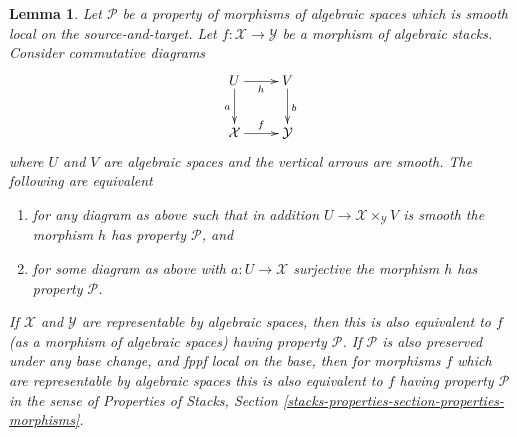 \documentclass[10pt,a4paper]{amsart}
\theoremstyle{plain}
\newtheorem{lemma}[subsection]{Lemma}
\theoremstyle{definition}
\theoremstyle{remark}
\numberwithin{equation}{subsection}
\begin{document}
\begin{lemma}
\label{lemma-local-source-target}
Let $\mathcal{P}$ be a property of morphisms of algebraic spaces
which is smooth local on the source-and-target.
Let $f : \mathcal{X} \to \mathcal{Y}$ be a morphism of algebraic stacks.
Consider commutative diagrams
$$
\xymatrix{
U \ar[d]_a \ar[r]_h & V \ar[d]^b \\
\mathcal{X} \ar[r]^f & \mathcal{Y}
}
$$
where $U$ and $V$ are algebraic spaces and the vertical arrows are smooth.
The following are equivalent
\begin{enumerate}
\item for any diagram as above such that in addition
$U \to \mathcal{X} \times_\mathcal{Y} V$ is smooth
the morphism $h$ has property $\mathcal{P}$, and
\item for some diagram as above with $a : U \to \mathcal{X}$ surjective
the morphism $h$ has property $\mathcal{P}$.
\end{enumerate}
If $\mathcal{X}$ and $\mathcal{Y}$ are representable by algebraic spaces,
then this is also equivalent to $f$ (as a morphism of algebraic spaces)
having property $\mathcal{P}$. If $\mathcal{P}$ is also preserved under
any base change, and fppf local on the base, then for morphisms $f$
which are representable by algebraic spaces this
is also equivalent to $f$ having property $\mathcal{P}$ in the sense
of
Properties of Stacks,
Section \ref{stacks-properties-section-properties-morphisms}.
\end{lemma}
\end{document}
